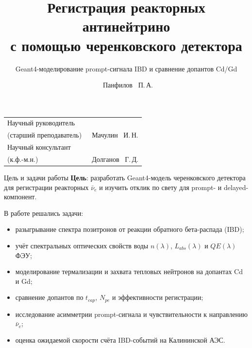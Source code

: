 \documentclass[aspectratio=169,12pt]{beamer}
\title[Реакторные $\bar{\nu}_e$ в черенковском детекторе]{Регистрация реакторных антинейтрино\\с помощью черенковского детектора}
\subtitle{Geant4-моделирование prompt-сигнала IBD и сравнение допантов Cd/Gd}
\author{~Панфилов ~П.\,А.}
\institute{НИЯУ МИФИ}
\begin{document}
\begin{frame}
  \titlepage

  \vspace{-0.4cm}
  \begin{center}
  \small
  \begin{tabular}{p{}p{}}
    Научный руководитель\\(старший преподаватель) &
    ~Мачулин ~И.\,Н.\\[0.35cm]
    Научный консультант\\(к.ф.-м.н.) &
    ~Долганов ~Г.\,Д.\\
  \end{tabular}
  \end{center}
\end{frame}

\begin{frame}{Цель и задачи работы}
\textbf{Цель}: разработать Geant4-модель черенковского детектора для регистрации реакторных $\bar{\nu}_e$ и изучить отклик по свету для prompt- и delayed-компонент.

\medskip
В работе решались задачи:
\begin{itemize}
    \item разыгрывание спектра позитронов от реакции обратного бета-распада (IBD);
    \item учёт спектральных оптических свойств воды $n(\lambda)$, $L_{abs}(\lambda)$ и $QE(\lambda)$ ФЭУ;
    \item моделирование термализации и захвата тепловых нейтронов на допантах Cd и Gd;
    \item сравнение допантов по $t_{cap}$, $N_{pe}$ и эффективности регистрации;
    \item исследование асимметрии prompt-сигнала и чувствительности к направлению $\bar{\nu}_e$;
    \item оценка ожидаемой скорости счёта IBD-событий на Калининской АЭС.
\end{itemize}
\end{frame}
\end{document}
